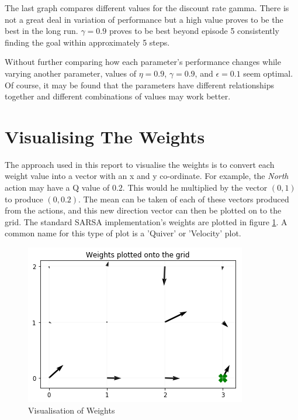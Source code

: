 \documentclass[11pt,journal,transmag,final]{IEEEtran}
\begin{document}
    The last graph compares different values for the discount rate gamma. There is not a great deal in variation of performance but a high value proves to be the best in the long run. $\gamma = 0.9$ proves to be best beyond episode 5 consistently finding the goal within approximately 5 steps.

    Without further comparing how each parameter's performance changes while varying another parameter, values of $\eta = 0.9$, $\gamma = 0.9$, and $\epsilon = 0.1$ seem optimal. Of course, it may be found that the parameters have different relationships together and different combinations of values may work better.

    \section{Visualising The Weights}

    The approach used in this report to visualise the weights is to convert each weight value into a vector with an x and y co-ordinate. For example, the \textit{North} action may have a Q value of $0.2$. This would he multiplied by the vector $(0, 1)$ to produce $(0, 0.2)$. The mean can be taken of each of these vectors produced from the actions, and this new direction vector can then be plotted on to the grid. The standard SARSA implementation's weights are plotted in figure \ref{fig:visualising-weights:plot}. A common name for this type of plot is a 'Quiver' or 'Velocity' plot.

    \begin{figure}
        \begin{center}
            \includegraphics[width=\linewidth,keepaspectratio]{figures/ss-qvalues.png}
            \caption{Visualisation of Weights}
            \label{fig:visualising-weights:plot}
        \end{center}
    \end{figure}
\end{document}

